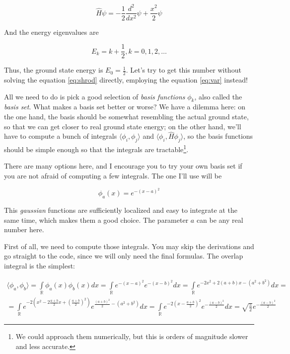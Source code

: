\documentclass{article}
\begin{document}
\begin{equation} \label{eq:harmonic-hamiltonian} \hat H \psi = -\frac{1}{2} \frac{d^2}{dx^2} \psi + \frac{x^2}{2} \psi \end{equation}

And the energy eigenvalues are\cite{ref:atkins}

\begin{equation} E_k = k + \frac{1}{2}, k = 0,1,2,\dots \end{equation}

Thus, the ground state energy is \(E_0=\frac{1}{2}\). Let's try to get this number without solving the equation \eqref{eq:shrod} directly, employing the equation \eqref{eq:var} instead!

All we need to do is pick a good selection of \textit{basis functions} \(\phi_k\), also called the \textit{basis set}. What makes a basis set better or worse? We have a dilemma here: on the one hand, the basis should be somewhat resembling the actual ground state, so that we can get closer to real ground state energy; on the other hand, we'll have to compute a bunch of integrals \(\langle \phi_i, \phi_j\rangle\) and \(\langle \phi_i, \hat H \phi_j\rangle\), so the basis functions should be simple enough so that the integrals are tractable\footnote{We could approach them numerically, but this is orders of magnitude slower and less accurate.}.

There are many options here, and I encourage you to try your own basis set if you are not afraid of computing a few integrals. The one I'll use will be

\begin{equation} \phi_a(x) = e^{-(x-a)^2} \end{equation}

This \textit{gaussian} functions are sufficiently localized and easy to integrate at the same time, which makes them a good choice. The parameter \(a\) can be any real number here.

First of all, we need to compute those integrals. You may skip the derivations and go straight to the code, since we will only need the final formulas. The overlap integral is the simplest:

\begin{equation} \label{eq:exp-overlap}
\begin{gathered}
\langle \phi_a, \phi_b \rangle = \int\limits_\mathbb{R} \phi_a(x) \phi_b(x) dx = \int\limits_\mathbb{R} e^{-(x-a)^2} e^{-(x-b)^2} dx = \int\limits_\mathbb{R} e^{-2x^2+2(a+b)x-\left(a^2+b^2\right)} dx =
\\
= \int\limits_\mathbb{R} e^{-2\left(x^2-2\frac{a+b}{2}x + \left(\frac{a+b}{2}\right)^2\right)} e^{\frac{(a+b)^2}{2} - \left(a^2+b^2\right)} dx = \int\limits_\mathbb{R} e^{-2\left(x-\frac{a+b}{2}\right)^2} e^{-\frac{(a-b)^2}{2}} dx = \sqrt{\frac{\pi}{2}} e^{-\frac{(a-b)^2}{2}}
\end{gathered}
\end{equation}
\end{document}
